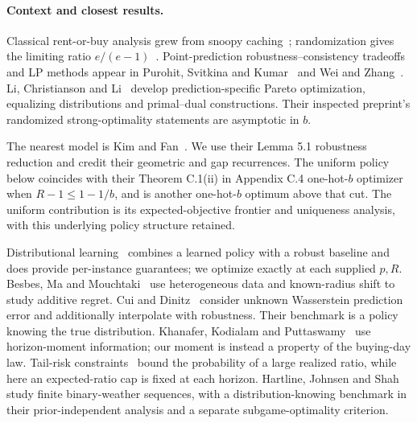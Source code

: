 \documentclass[manuscript,11pt,screen,nonacm]{acmart}
\begin{document}
\paragraph{Context and closest results.}
Classical rent-or-buy analysis grew from snoopy caching~\cite{Karlin1988};
randomization gives the limiting ratio $e/(e-1)$~\cite{Karlin1994}.
Point-prediction robustness--consistency tradeoffs and LP methods appear in
Purohit, Svitkina and Kumar~\cite{NEURIPS2018_73a427ba} and Wei and
Zhang~\cite{NEURIPS2020_5bd844f1}. Li, Christianson and Li~\cite{Li_2026}
develop prediction-specific Pareto optimization, equalizing distributions
and primal--dual constructions. Their inspected preprint's randomized
strong-optimality statements are asymptotic in $b$.

The nearest model is Kim and Fan~\cite{pmlr-v306-kim26l}. We use their
Lemma 5.1 robustness reduction and credit their geometric and gap
recurrences. The uniform policy below coincides with their Theorem C.1(ii) in Appendix C.4
one-hot-$b$ optimizer when $R-1\le1-1/b$, and is another one-hot-$b$ optimum
above that cut. The uniform contribution is its expected-objective frontier
and uniqueness analysis, with this underlying policy structure retained.

Distributional learning~\cite{pmlr-v139-diakonikolas21a} combines a learned
policy with a robust baseline and does provide per-instance guarantees;
we optimize exactly at each supplied $p,R$. Besbes, Ma and
Mouchtaki~\cite{Besbes_2025} use heterogeneous data and known-radius
shift to study additive regret. Cui and Dinitz~\cite{pmlr-v306-cui26a}
consider unknown Wasserstein prediction error and additionally interpolate
with robustness. Their benchmark is a policy knowing the true distribution.
Khanafer, Kodialam and Puttaswamy~\cite{Khanafer_2013} use horizon-moment
information; our moment is instead a property of the buying-day law.
Tail-risk constraints~\cite{Dinitz_2024,10.1007/978-3-032-06706-7_6}
bound the probability of a large realized ratio, while here an expected-ratio
cap is fixed at each horizon. Hartline, Johnsen and
Shah~\cite{hartline_et_al:LIPIcs.ITCS.2026.75} study finite binary-weather
sequences, with a distribution-knowing benchmark in their prior-independent
analysis and a separate subgame-optimality criterion.
\end{document}
